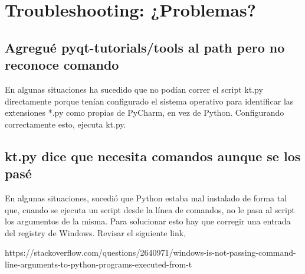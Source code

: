 \section{Troubleshooting: ¿Problemas?}

\subsection{Agregu\'e pyqt-tutorials/tools al path pero no reconoce comando}
En algunas situaciones ha sucedido que no pod\'ian correr el script kt.py directamente
porque ten\'ian configurado el sistema operativo para identificar las extensiones *.py como
propias de PyCharm, en vez de Python. Configurando correctamente esto, ejecuta kt.py.

\subsection{kt.py dice que necesita comandos aunque se los pasé}
En algunas situaciones, sucedi\'o que Python estaba mal instalado de forma tal que, cuando se ejecuta un
script desde la l\'inea de comandos, no le pasa al script los argumentos de la misma. Para solucionar esto
hay que corregir una entrada del registry de Windows. Revisar el siguiente link,

https://stackoverflow.com/questions/2640971/windows-is-not-passing-command-line-arguments-to-python-programs-executed-from-t
